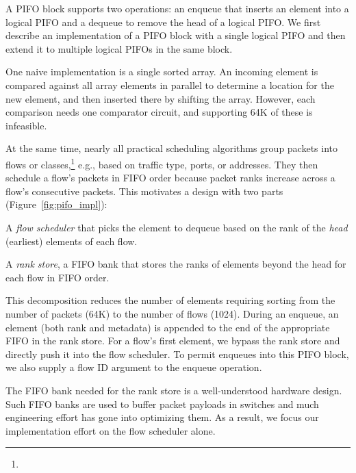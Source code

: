 A PIFO block supports two operations: an enqueue that inserts an
element into a logical PIFO and a dequeue to remove the head of a
logical PIFO.  We first describe an implementation of a PIFO block with a
single logical PIFO and then extend it to multiple logical PIFOs in the same
block.

One naive implementation is a single sorted array. An incoming element is
compared against all array elements in parallel to determine a location for the
new element, and then inserted there by shifting the array.  However, each
comparison needs one comparator circuit, and supporting 64K of
these is infeasible.

At the same time, nearly all practical scheduling algorithms group packets into
flows or classes,\footnote{} e.g., based on
traffic type, ports, or addresses. They then schedule a flow's packets in FIFO
order because packet ranks increase across a flow's consecutive packets.  This
motivates a design with two parts (Figure~\ref{fig:pifo_impl}):
\begin{CompactEnumerate}
\item A {\em flow scheduler} that picks the element to dequeue based on the rank of the {\em
head} (earliest) elements of each flow. 
\item A {\em rank store}, a FIFO bank that stores the ranks of
  elements beyond the head for each flow in FIFO order.
\end{CompactEnumerate}

This decomposition reduces the number of elements requiring sorting from the
number of packets (64K) to the number of flows (1024). During an enqueue, an
element (both rank and metadata) is appended to the end of the appropriate FIFO
in the rank store. For a flow's first element, we bypass the rank store and
directly push it into the flow scheduler. To permit enqueues into this PIFO
block, we also supply a flow ID argument to the enqueue operation.

The FIFO bank needed for the rank store is a well-understood hardware
design. Such FIFO banks are used to buffer packet payloads in switches and
much engineering effort has gone into optimizing them.  As a result,
we focus our implementation effort on the flow scheduler alone.

